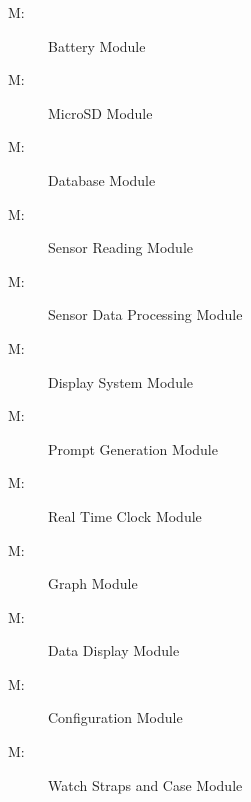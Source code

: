 \documentclass[12pt, titlepage]{article}
\newcounter{mnum}
\newcommand{\mthemnum}{M\themnum}
\begin{document}
\begin{description}
  \item [ \mthemnum \label{mBM}:] Battery Module
  \item [ \mthemnum \label{mDS_1}:] MicroSD Module
  \item [ \mthemnum \label{mDS_2}:] Database Module
  \item [ \mthemnum \label{mSA1}:] Sensor Reading Module
  \item [ \mthemnum \label{mSA2}:] Sensor Data Processing Module
  \item [ \mthemnum \label{mDS_2}:] Display System Module
  \item [ \mthemnum \label{mPG}:] Prompt Generation Module
  \item [ \mthemnum \label{mRTC}:] Real Time Clock  Module
  \item [ \mthemnum \label{mGP}:] Graph  Module
  \item [ \mthemnum \label{mGP2}:] Data Display Module
  \item [ \mthemnum \label{mPS}:] Configuration Module
  \item [ \mthemnum \label{mPD}:]  Watch Straps and Case Module
\end{description}
\end{document}
